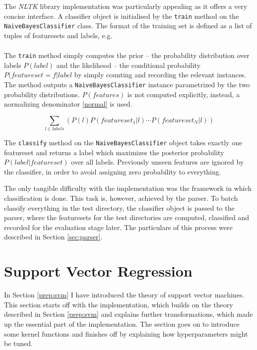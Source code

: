 \documentclass[12pt,notitlepage,twoside]{scrbook}
\begin{document}
The \textit{NLTK} library implementation was particularly appealing as it offers a very
concise interface. A classifier object is initialised by the \texttt{train}
method on the \texttt{NaiveBayesClassifier} class. The format of the training
set is defined as a list of tuples of featuresets and labels, e.g.
\begin{gather*}
[(featureset_1, label_1), \cdots, (featureset_N,
label_N)]
\end{gather*}

The \texttt{train} method simply computes the prior -- the probability
distribution over labels \(P(label)\) and the likelihood -- the conditional
probability \(P(featureset=f|label\) by simply counting and recording the
relevant instances. The method outputs a \texttt{NaiveBayesClassifier} instance
parametrized by the two probability distributions. \(P(features)\) is not
computed explicitly, instead, a normalizing denominator \ref{normal} is used.

\begin{equation} \sum_{l \in labels}(P(l)P(featureset_1|l)\cdots
	P(featureset_N|l)) \label{normal} \end{equation}

The \texttt{classify} method on the \texttt{NaiveBayesClassifier} object takes
exactly one featureset and returns a label which maximizes the posterior
probability \(P(label|featureset)\) over all labels.  Previously unseen features
are ignored by the classifier, in order to avoid assigning zero probability to
everything.

The only tangible difficulty with the implementation was the
framework in which classification is done. This task is, however, achieved by
the parser. To batch classify everything in the test directory, the classifier
object is passed to the parser, where the featuresets for the test directories
are computed, classified and recorded for the evaluation stage later. The
particulars of this process were described in Section \ref{sec:parser}.

\section{Support Vector Regression}
\label{sec:svm}
In Section \ref{prep:svm} I have introduced the theory of support vector machines. This
section starts off with the implementation, which builds on the theory described in
Section \ref{prep:svm} and explains further transformations, which made up the essential
part of the implementation. The section goes on to introduce some kernel functions and
finishes off by explaining how hyperparameters might be tuned.
\end{document}
